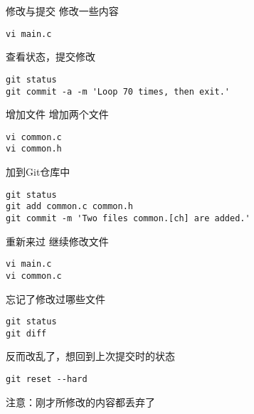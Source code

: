 \begin{frame}[<+->][fragile]{修改与提交}
\onslide<+->
修改一些内容
\begin{Verbatim}[frame=single,commandchars=\\\{\}]
vi main.c
\end{Verbatim}

\onslide<+->
查看状态，提交修改
\begin{Verbatim}[frame=single,commandchars=\\\{\}]
git status
git commit -a -m 'Loop 70 times, then exit.'
\end{Verbatim}
\end{frame}

\begin{frame}[<+->][fragile]{增加文件}
\onslide<+->
增加两个文件
\begin{Verbatim}[frame=single,commandchars=\\\{\}]
vi common.c
vi common.h
\end{Verbatim}

\onslide<+->
加到Git仓库中
\begin{Verbatim}[frame=single,commandchars=\\\{\}]
git status
git add common.c common.h
git commit -m 'Two files common.[ch] are added.'
\end{Verbatim}
\end{frame}

\begin{frame}[<+->][fragile]{重新来过}
\onslide<+->
继续修改文件
\begin{Verbatim}[frame=single,commandchars=\\\{\}]
vi main.c
vi common.c
\end{Verbatim}

\onslide<+->
忘记了修改过哪些文件
\begin{Verbatim}[frame=single,commandchars=\\\{\}]
git status
git diff
\end{Verbatim}

\onslide<+->
反而改乱了，想回到上次提交时的状态
\begin{Verbatim}[frame=single,commandchars=\\\{\}]
git reset --hard
\end{Verbatim}
注意：刚才所修改的内容都丢弃了
\end{frame}

